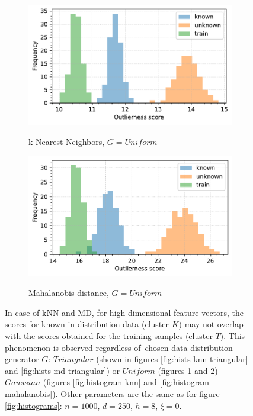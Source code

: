\begin{figure}[t]
\begin{subfigure}[b]{0.495\textwidth}
        \caption{\small k-Nearest Neighbors, $G = \textit{Uniform}$}
        \includegraphics[width=\textwidth]{images/distributions/hists-Gen/hist-distributions-dimension_250-samples_1000-distance_8-distribution_uniform-model_kNN-10-seed_0.pdf}
        \label{fig:hists-knn-uniform}
    \end{subfigure}
    \hfill
    \begin{subfigure}[b]{0.495\textwidth}
        \centering
        \caption{\small Mahalanobis distance, $G = \textit{Uniform}$}
        \includegraphics[width=\textwidth]{images/distributions/hists-Gen/hist-distributions-dimension_250-samples_1000-distance_8-distribution_uniform-model_MD-seed_0.pdf}
        \label{fig:hists-md-uniform}
    \end{subfigure}
    \caption{In case of kNN and MD, for high-dimensional feature vectors, the scores for known in-distribution data (cluster $K$) may not overlap with the scores obtained for the training samples (cluster $T$). This phenomenon is observed regardless of~chosen data distribution generator $G$: $\textit{Triangular}$ (shown in figures \ref{fig:hists-knn-triangular} and \ref{fig:hists-md-triangular}) or $\textit{Uniform}$ (figures \ref{fig:hists-knn-uniform} and \ref{fig:hists-md-uniform}) $\textit{Gaussian}$ (figures \ref{fig:histogram-knn} and \ref{fig:histogram-mahalanobis}). Other parameters are the same as for figure \ref{fig:histograms}: $n = 1000$, $d = 250$, $h = 8$, $\xi = 0$.}
    \label{fig:histograms-other-G}
\end{figure}

